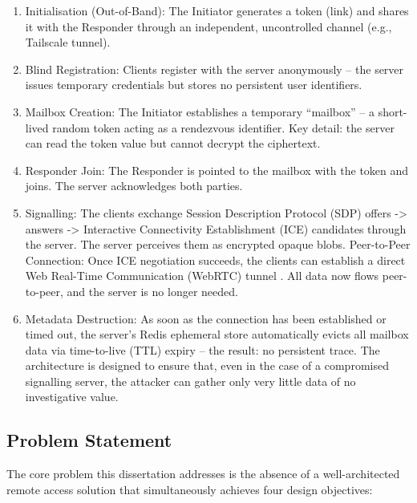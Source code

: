 \documentclass[12pt,a4paper]{article}
\begin{document}
\begin{enumerate}

\item Initialisation (Out-of-Band): The Initiator generates a token (link) and shares it with the Responder through an independent, uncontrolled channel (e.g., Tailscale \cite{tailscale} tunnel).

\item Blind Registration: Clients register with the server anonymously – the server issues temporary credentials but stores no persistent user identifiers.

\item Mailbox Creation: The Initiator establishes a temporary “mailbox” – a short-lived random token acting as a rendezvous identifier. Key detail: the server can read the token value but cannot decrypt the ciphertext.

\item Responder Join: The Responder is pointed to the mailbox with the token and joins. The server acknowledges both parties.

\item Signalling: The clients exchange Session Description Protocol (SDP) offers -> answers -> Interactive Connectivity Establishment (ICE) candidates through the server. The server perceives them as encrypted opaque blobs. Peer-to-Peer Connection: Once ICE negotiation succeeds, the clients can establish a direct Web Real-Time Communication (WebRTC) tunnel \cite{rfc8825}. All data now flows peer-to-peer, and the server is no longer needed.

\item Metadata Destruction: As soon as the connection has been established or timed out, the server’s Redis \cite{redis} ephemeral store automatically evicts all mailbox data via time-to-live (TTL) expiry – the result: no persistent trace. The architecture is designed to ensure that, even in the case of a compromised signalling server, the attacker can gather only very little data of no investigative value.

\end{enumerate}

\subsection{Problem Statement}

The core problem this dissertation addresses is the absence of a well-architected remote access solution that simultaneously achieves four design objectives:
\end{document}

